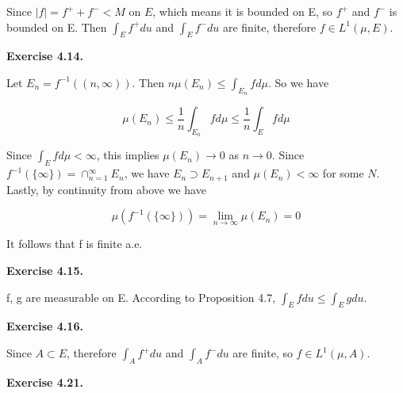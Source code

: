 \documentclass[12pt]{article}
\newcommand{\abs}[1]{\left| #1 \right|}
\begin{document}
Since $\abs{f} = f^{+} + f^{-} < M$ on $E$, which means it is bounded on E, so $f^{+}$ and $f^{-}$ is bounded on E. Then $\int_{E}f^{+}du$ and $\int_{E}f^{-}du$ are finite, therefore $f \in L^{1}(\mu, E)$.

\textbf{Exercise 4.14.}

Let $E_n = f^{-1}((n,\infty))$. Then $n\mu(E_n) \leq \int_{E_n} fd\mu$. So we have

$$ \mu(E_n) \leq \frac{1}{n} \int_{E_n}  fd\mu \leq  \frac{1}{n} \int_{E}  fd\mu  $$

Since  $\int_{E}  fd\mu < \infty$, this implies $\mu(E_n) \rightarrow 0$ as $n \rightarrow 0$. Since $f^{-1}(\{\infty\}) = \cap_{n=1}^{\infty}E_{n}$, we have $E_{n} \supset E_{n+1}$ and $\mu(E_n) < \infty$ for some $N$. Lastly, by continuity from above we have

$$\mu(f^{-1}(\{\infty\})) = \lim_{n \rightarrow \infty} \mu(E_n) = 0$$

It follows that f is finite a.e.

\textbf{Exercise 4.15.}

f, g are measurable on E. According to Proposition 4.7, $\int_{E}f du \leq \int_{E}g du$.

\textbf{Exercise 4.16.}

Since $A \subset E$, therefore $\int_{A}f^{+} du$ and $\int_{A}f^{-} du$ are finite, so $f \in L^{1}(\mu, A)$.

\textbf{Exercise 4.21.}
 
\end{document}
